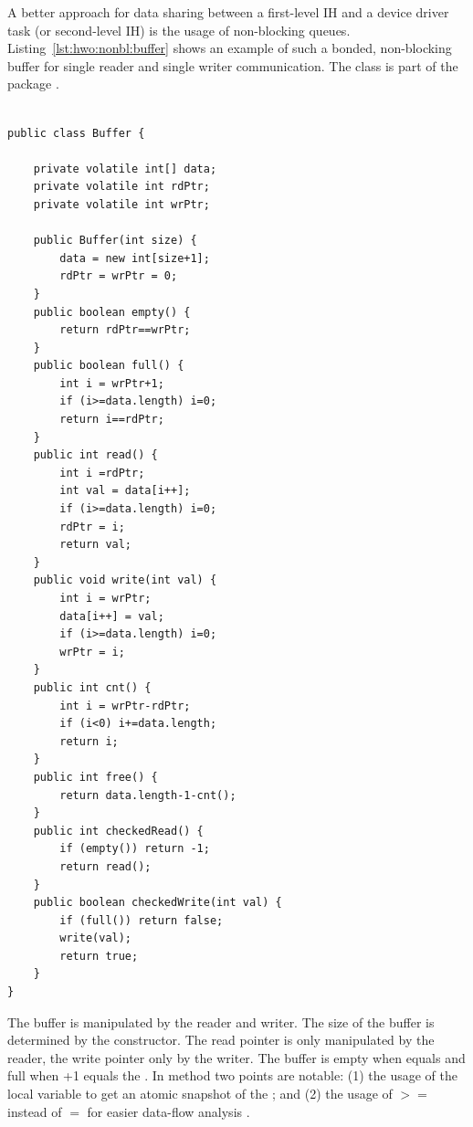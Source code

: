 A better approach for data sharing between a first-level IH and a
device driver task (or second-level IH) is the usage of non-blocking
queues.  Listing~\ref{lst:hwo:nonbl:buffer} shows an example of such
a bonded, non-blocking buffer for single reader and single writer
communication. The class  is part of the package
.

 

\begin{lstlisting}[caption={A non-blocking integer buffer for a
single reader and a single writer. Classical usage is in an interrupt
handler.}, label=lst:hwo:nonbl:buffer]

public class Buffer {

    private volatile int[] data;
    private volatile int rdPtr;
    private volatile int wrPtr;

    public Buffer(int size) {
        data = new int[size+1];
        rdPtr = wrPtr = 0;
    }
    public boolean empty() {
        return rdPtr==wrPtr;
    }
    public boolean full() {
        int i = wrPtr+1;
        if (i>=data.length) i=0;
        return i==rdPtr;
    }
    public int read() {
        int i =rdPtr;
        int val = data[i++];
        if (i>=data.length) i=0;
        rdPtr = i;
        return val;
    }
    public void write(int val) {
        int i = wrPtr;
        data[i++] = val;
        if (i>=data.length) i=0;
        wrPtr = i;
    }
    public int cnt() {
        int i = wrPtr-rdPtr;
        if (i<0) i+=data.length;
        return i;
    }
    public int free() {
        return data.length-1-cnt();
    }
    public int checkedRead() {
        if (empty()) return -1;
        return read();
    }
    public boolean checkedWrite(int val) {
        if (full()) return false;
        write(val);
        return true;
    }
}
\end{lstlisting}


The buffer  is manipulated by the reader and writer. The
size of the buffer is determined by the constructor. The read pointer
 is only manipulated by the reader, the write pointer
 only by the writer. The buffer is empty when
 equals  and full when +1 equals
the . In method  two points are notable: (1)
the usage of the local variable to get an atomic snapshot of the
; and (2) the usage of $>=$ instead of $=$ for easier
data-flow analysis \cite{dfa:puffitsch:2009}.

